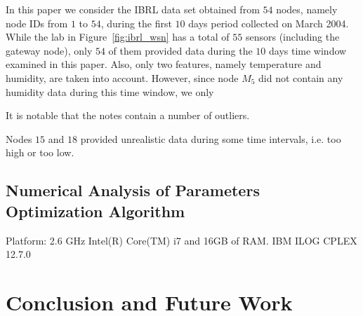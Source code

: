 \documentclass[3p,times]{elsarticle}
\begin{document}
In this paper we consider the IBRL data set obtained from $54$ nodes, namely node IDs from $1$ to $54$, during the first $10$ days period collected on March 2004. While the lab in Figure~\ref{fig:ibrl_wsn} has a total of $55$ sensors (including the gateway node), only $54$ of them provided data during the $10$ days time window examined in this paper. Also, only two features, namely temperature and humidity, are taken into account. However, since node $M_5$ did not contain any humidity data during this time window, we only 

It is notable that the notes contain a number of outliers.

Nodes $15$ and $18$ provided unrealistic data during some time intervals, i.e. too high or too low. 

\subsection{Numerical Analysis of Parameters Optimization Algorithm}

Platform: 2.6 GHz Intel(R) Core(TM) i7 and 16GB of RAM.
IBM ILOG CPLEX 12.7.0

\section{Conclusion and Future Work}



\end{document}
